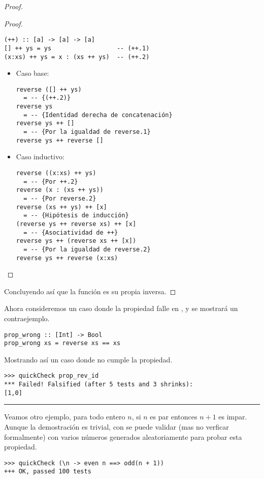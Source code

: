 \begin{proof}
\begin{proof}
\begin{verbatim}
(++) :: [a] -> [a] -> [a]
[] ++ ys = ys                  -- (++.1)
(x:xs) ++ ys = x : (xs ++ ys)  -- (++.2)
\end{verbatim}

\begin{itemize}
\item Caso base:
\begin{verbatim}
reverse ([] ++ ys)
  = -- {(++.2)}
reverse ys
  = -- {Identidad derecha de concatenación}
reverse ys ++ []
  = -- {Por la igualdad de reverse.1}
reverse ys ++ reverse []
\end{verbatim}

\item Caso inductivo:
\begin{verbatim}
reverse ((x:xs) ++ ys)
  = -- {Por ++.2}
reverse (x : (xs ++ ys))
  = -- {Por reverse.2}
reverse (xs ++ ys) ++ [x]
  = -- {Hipótesis de inducción}
(reverse ys ++ reverse xs) ++ [x]
  = -- {Asociatividad de ++}
reverse ys ++ (reverse xs ++ [x])
  = -- {Por la igualdad de reverse.2}
reverse ys ++ reverse (x:xs)
\end{verbatim}
\end{itemize}

\end{proof}

Concluyendo así que la función  es su propia inversa.
\end{proof}

Ahora consideremos un caso donde la propiedad falle en \QuickCheck, y se mostrará un contraejemplo.
\begin{verbatim}
prop_wrong :: [Int] -> Bool
prop_wrong xs = reverse xs == xs 
\end{verbatim}

Mostrando así un caso donde no cumple la propiedad.
\begin{verbatim}
>>> quickCheck prop_rev_id
*** Failed! Falsified (after 5 tests and 3 shrinks):
[1,0]
\end{verbatim}

\noindent\rule{\textwidth}{1pt}

Veamos otro ejemplo, para todo entero $n$, si $n$ es par entonces $n+1$ es impar. Aunque la
demostración es trivial, con \QuickCheck se puede validar (mas no verficar formalmente) con
varios números generados aleatoriamente para probar esta propiedad.
\begin{verbatim}
>>> quickCheck (\n -> even n ==> odd(n + 1))
+++ OK, passed 100 tests
\end{verbatim}

